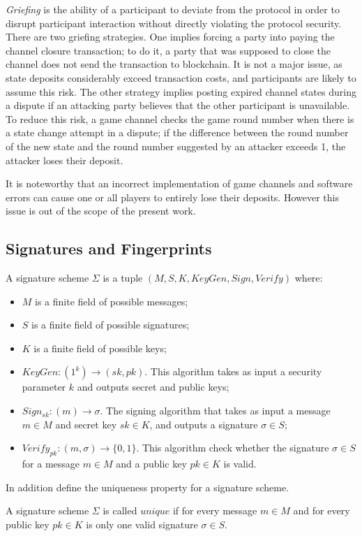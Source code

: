 \textit {Griefing} is the ability of a participant to deviate from the protocol in order to disrupt participant interaction without directly violating the protocol security. There are two griefing strategies. One implies forcing a party into paying the channel closure transaction; to do it, a party that was supposed to close the channel does not send the transaction to blockchain. It is not a major issue, as state deposits considerably exceed transaction costs, and participants are likely to assume this risk. The other strategy implies posting expired channel states during a dispute if an attacking party believes that the other participant is unavailable. To reduce this risk, a game channel checks the game round number when there is a state change attempt in a dispute; if the difference between the round number of the new state and the round number suggested by an attacker exceeds 1, the attacker loses their deposit.

It is noteworthy that an incorrect implementation of game channels and software errors can cause one or all players to entirely lose their deposits. However this issue is out of the scope of the present work.

	\subsection{Signatures and Fingerprints}
\begin{defn}
A signature scheme $ \Sigma $ is a tuple $(M, S, K, KeyGen, Sign, Verify)$ where:
	\begin{itemize}
		\item $ M $ is a finite field of possible messages;
		\item $ S $ is a finite field of possible signatures;
		\item $ K $ is a finite field of possible keys;
		\item $ KeyGen: (1^k) \rightarrow (sk, pk) $. This algorithm takes as input a security parameter $k$ and outputs secret and public keys;
		\item $Sign_{sk}: (m) \rightarrow \sigma $. The signing algorithm that takes as input a message $m \in M$ and secret key $sk \in K$, and outputs a signature $\sigma \in S$;
	\item $Verify_{pk}: (m, \sigma) \rightarrow \{0, 1\} $. This algorithm check whether the signature $\sigma \in S$ for a message $m \in M$ and a public key $pk \in K$ is valid.
	\end{itemize}
\end{defn}
In addition define the uniqueness property for a signature scheme. 
\begin{defn}
A signature scheme $ \Sigma $ is called $unique$ if for every message $m \in M$ and for every public key $pk \in K$ is only one valid signature $\sigma \in S$.
\end{defn}

